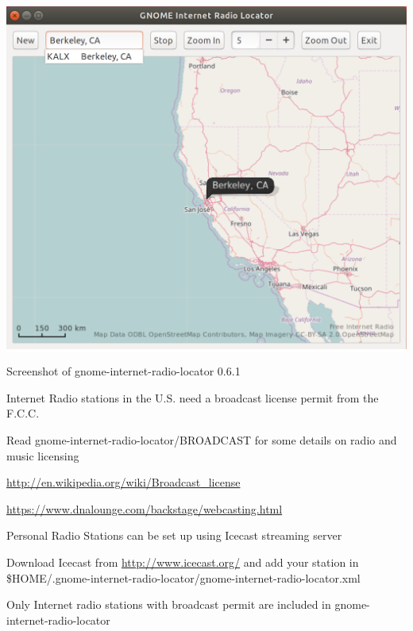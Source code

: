 \documentclass[20pt,landscape]{foils}
\begin{document}

\begin{center}

  \colorbox{white}{\includegraphics[width=0.6\hsize]{../data/screenshot.png}}

  {\blueem Screenshot of gnome-internet-radio-locator 0.6.1}

\end{center}


\begin{list1}
  \item Internet Radio stations in the U.S. need a broadcast license permit from the F.C.C.
    \begin{list2}
    \item Read gnome-internet-radio-locator/BROADCAST for some details on radio and music licensing
    \item \url{http://en.wikipedia.org/wiki/Broadcast_license}
    \item \url{https://www.dnalounge.com/backstage/webcasting.html}
    \end{list2}
  \item Personal Radio Stations can be set up using Icecast streaming server
    \begin{list2}
    \item Download Icecast from \url{http://www.icecast.org/} and add your station in \$HOME/.gnome-internet-radio-locator/gnome-internet-radio-locator.xml
    \end{list2}
  \item Only Internet radio stations with broadcast permit are included in gnome-internet-radio-locator
\end{list1}

\end{document}
